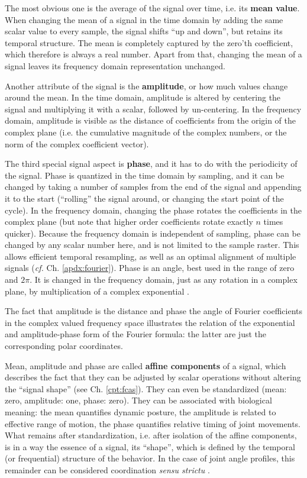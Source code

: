 The most obvious one is the average of the signal over time, i.e. its \textbf{mean value}.
When changing the mean of a signal in the time domain by adding the same scalar value to every sample, the signal shifts ``up and down'', but retains its temporal structure.
The mean is completely captured by the zero'th coefficient, which therefore is always a real number.
Apart from that, changing the mean of a signal leaves its frequency domain representation unchanged.

Another attribute of the signal is the \textbf{amplitude}, or how much values change around the mean.
In the time domain, amplitude is altered by centering the signal and multiplying it with a scalar, followed by un-centering.
In the frequency domain, amplitude is visible as the distance of coefficients from the origin of the complex plane (i.e. the cumulative magnitude of the complex numbers, or the norm of the complex coefficient vector).

The third special signal aspect is \textbf{phase}, and it has to do with the periodicity of the signal.
Phase is quantized in the time domain by sampling, and it can be changed by taking a number of samples from the end of the signal and appending it to the start (``rolling'' the signal around, or changing the start point of the cycle).
In the frequency domain, changing the phase rotates the coefficients in the complex plane (but note that higher order coefficients rotate exactly \(n\) times quicker).
Because the frequency domain is independent of sampling, phase can be changed by any scalar number here, and is not limited to the sample raster.
This allows efficient temporal resampling, as well as an optimal alignment of multiple signals (\emph{cf.} Ch. \ref{apdx:fourier}).
Phase is an angle, best used in the range of zero and \(2\pi\).
It is changed in the frequency domain, just as any rotation in a complex plane, by multiplication of a complex exponential \citep[``delay/shift theorem'', \textit{cf.}][]{Bracewell2000}.

The fact that amplitude is the distance and phase the angle of Fourier coefficients in the complex valued frequency space illustrates the relation of the exponential and amplitude-phase form of the Fourier formula: the latter are just the corresponding polar coordinates.


Mean, amplitude and phase are called \textbf{affine components} of a signal, which describes the fact that they can be adjusted by scalar operations without altering the ``signal shape'' (see Ch. \ref{cpt:fcas}).
They can even be standardized (mean: zero, amplitude: one, phase: zero).
They can be associated with biological meaning: the mean quantifies dynamic posture, the amplitude is related to effective range of motion, the phase quantifies relative timing of joint movements.
What remains after standardization, i.e. after isolation of the affine components, is in a way the essence of a signal, its ``shape'', which is defined by the temporal (or frequential) structure of the behavior.
In the case of joint angle profiles, this remainder can be considered coordination \emph{sensu strictu} \citep{Mielke2019,Mielke2023}.

